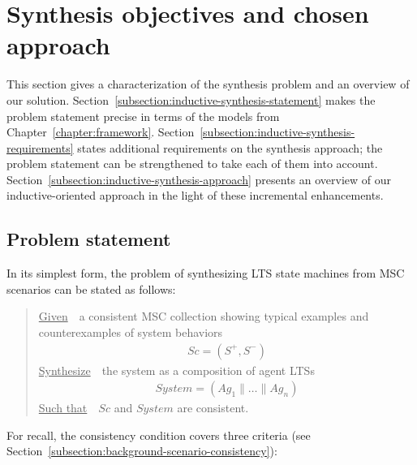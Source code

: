 \section{Synthesis objectives and chosen approach\label{section:inductive-objectives-and-approach}}

This section gives a characterization of the synthesis problem and an overview of our solution. Section~\ref{subsection:inductive-synthesis-statement} makes the problem statement precise in terms of the models from Chapter~\ref{chapter:framework}. Section~\ref{subsection:inductive-synthesis-requirements} states additional requirements on the synthesis approach; the problem statement can be strengthened to take each of them into account. Section~\ref{subsection:inductive-synthesis-approach} presents an overview of our inductive-oriented approach in the light of these incremental enhancements.


\subsection{Problem statement\label{subsection:inductive-synthesis-statement}}

In its simplest form, the problem of synthesizing LTS state machines from MSC scenarios can be stated as follows:

\begin{quote}
\underline{Given}~~a consistent MSC collection showing typical examples and counterexamples of system behaviors
\begin{align*}
Sc = (S^+,S^-)
\end{align*}
\underline{Synthesize}~~the system as a composition of agent LTSs
\begin{align*}
System = (Ag_1 \parallel \ldots \parallel Ag_n)
\end{align*}
\underline{Such that}~~$Sc$ and $System$ are consistent.
\end{quote}

\noindent For recall, the consistency condition covers three criteria (see Section~\ref{subsection:background-scenario-consistency}):

